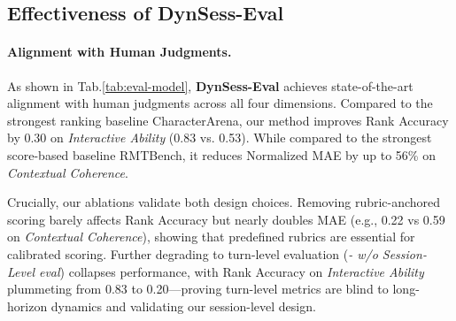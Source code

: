 \begin{table}[t] \centering  \caption{Stability statistics across 9 trials per model. Variances are relatively small compared with means.} 
\label{tab:model_statistics} 
\end{table}


\subsection{Effectiveness of DynSess-Eval}

\paragraph{Alignment with Human Judgments.}
As shown in Tab.\ref{tab:eval-model}, \textbf{DynSess-Eval} achieves state-of-the-art alignment with human judgments across all four dimensions. Compared to the strongest ranking baseline CharacterArena, our method improves Rank Accuracy by 0.30 on \textit{Interactive Ability} (0.83 vs. 0.53). While compared to the strongest score-based baseline RMTBench, it reduces Normalized MAE by up to 56\% on \textit{Contextual Coherence}.

Crucially, our ablations validate both design choices. Removing rubric-anchored scoring barely affects Rank Accuracy but nearly doubles MAE (e.g., 0.22 vs 0.59 on \textit{Contextual Coherence}), showing that predefined rubrics are essential for calibrated scoring. Further degrading to turn-level evaluation (\textit{- w/o Session-Level eval}) collapses performance, with Rank Accuracy on \textit{Interactive Ability} plummeting from 0.83 to 0.20—proving turn-level metrics are blind to long-horizon dynamics and validating our session-level design.








